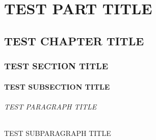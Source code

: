 \documentclass{binder}
\begin{document}


\tableofcontents


\part{TEST PART TITLE}

\chapter{TEST CHAPTER TITLE}

\section{TEST SECTION TITLE}

\subsection{TEST SUBSECTION TITLE}

\paragraph{TEST PARAGRAPH TITLE}

\subparagraph{TEST SUBPARAGRAPH TITLE}

\blindtext[1]

\begin{testcolors}
\end{testcolors}
\end{document}
